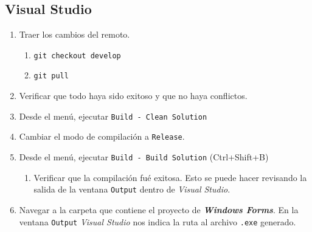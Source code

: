 \documentclass[12pt,a4paper]{article}
\begin{document}
\subsection*{Visual Studio}\label{despliegueVS}
\begin{enumerate}
	\item Traer los cambios del remoto.
	\begin{enumerate}
		\item \texttt{git checkout develop}
		\item \texttt{git pull}
	\end{enumerate}
	\item Verificar que todo haya sido exitoso y que no haya conflictos.
	\item Desde el menú, ejecutar \texttt{Build - Clean Solution}
	\begin{figure}[H]		\centering {} \end{figure}
	\item Cambiar el modo de compilación a \texttt{Release}.
		\begin{figure}[H]		\centering {} 
		\end{figure}
	\item Desde el menú, ejecutar \texttt{Build - Build Solution} (Ctrl+Shift+B)
	\begin{enumerate}
		\item Verificar que la compilación fué exitosa. Esto se puede hacer revisando la salida de la ventana \texttt{Output} dentro de \textit{Visual Studio}.
	\end{enumerate}
	\item Navegar a la carpeta que contiene el proyecto de \textbf{\textit{Windows Forms}}. En la ventana \texttt{Output} \textit{Visual Studio} nos indica la ruta al archivo \texttt{.exe} generado.
	\begin{enumerate}\label{carpetaRelease}

\end{enumerate}
\end{enumerate}
\end{document}
